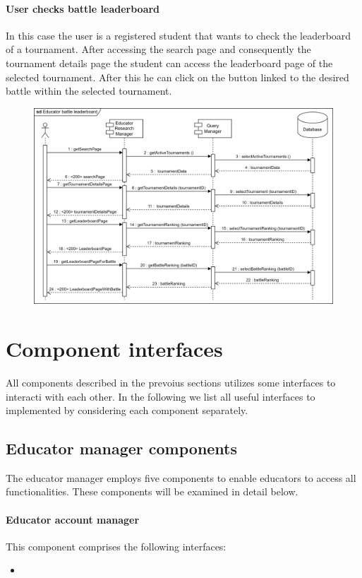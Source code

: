 \documentclass[12pt, a4paper]{report}
\begin{document}
    \paragraph*{User checks battle leaderboard}
    In this case the user is a registered student that wants to check the leaderboard of a tournament. 
    After accessing the search page and consequently the tournament details page the student can access the leaderboard page of the selected tournament. 
    After this he can click on the button linked to the desired battle within the selected tournament. 
    \begin{figure}[H]
        \centering
        \includegraphics[width=1.0\linewidth]{images/eblrv.png}
    \end{figure}


    \section{Component interfaces}
    All components described in the prevoius sections utilizes some interfaces to interacti with each other. 
    In the following we list all useful interfaces to implemented by considering each component separately. 

    \subsection{Educator manager components}
    The educator manager employs five components to enable educators to access all functionalities. 
    These components will be examined in detail below.
    
    \paragraph*{Educator account manager}
    This component comprises the following interfaces: 
    \begin{itemize}
        \item 
    \end{itemize}
\end{document}
